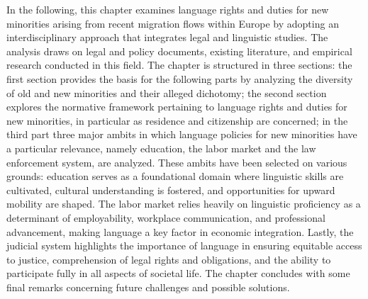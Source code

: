 \documentclass[output=paper,colorlinks,citecolor=brown]{langscibook}
\begin{document}
In the following, this chapter examines language rights and duties for new minorities arising from recent migration flows within Europe by adopting an interdisciplinary approach that integrates legal and linguistic studies. The analysis draws on legal and policy documents, existing literature, and empirical research conducted in this field. The chapter is structured in three sections: the first section provides the basis for the following parts by analyzing the diversity of old and new minorities and their alleged dichotomy; the second section explores the normative framework pertaining to language rights and duties for new minorities, in particular as residence and citizenship are concerned; in the third part three major ambits in which language policies for new minorities have a particular relevance, namely education, the labor market and the law enforcement system, are analyzed. These ambits have been selected on various grounds: education serves as a foundational domain where linguistic skills are cultivated, cultural understanding is fostered, and opportunities for upward mobility are shaped. The labor market relies heavily on linguistic proficiency as a determinant of employability, workplace communication, and professional advancement, making language a key factor in economic integration. Lastly, the judicial system highlights the importance of language in ensuring equitable access to justice, comprehension of legal rights and obligations, and the ability to participate fully in all aspects of societal life. The chapter concludes with some final remarks concerning future challenges and possible solutions.
\end{document}
